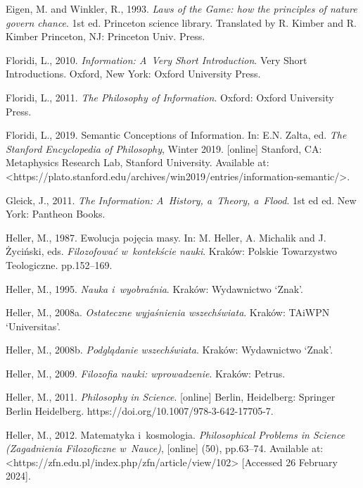 Eigen, M. and Winkler, R., 1993. \textit{Laws of the Game: how the principles of nature govern chance}. 1st ed. Princeton science library. Translated by R. Kimber and R. Kimber Princeton, NJ: Princeton Univ. Press.



Floridi, L., 2010. \textit{Information: A~Very Short Introduction}. Very Short Introductions. Oxford, New York: Oxford University Press.



Floridi, L., 2011. \textit{The Philosophy of Information}. Oxford: Oxford University Press.



Floridi, L., 2019. Semantic Conceptions of Information. In: E.N. Zalta, ed. \textit{The Stanford Encyclopedia of Philosophy}, Winter 2019. [online] Stanford, CA: Metaphysics Research Lab, Stanford University. Available at: {\textless}https://plato.stanford.edu/archives/win2019/entries/information-semantic/{\textgreater}.



Gleick, J., 2011. \textit{The Information: A~History, a~Theory, a~Flood}. 1st ed ed. New York: Pantheon Books.



Heller, M., 1987. Ewolucja pojęcia masy. In: M. Heller, A. Michalik and J. Życiński, eds. \textit{Filozofować w~kontekście nauki}. Kraków: Polskie Towarzystwo Teologiczne. pp.152–169.



Heller, M., 1995. \textit{Nauka i~wyobraźnia}. Kraków: Wydawnictwo ‘Znak'.



Heller, M., 2008a. \textit{Ostateczne wyjaśnienia wszechświata}. Kraków: TAiWPN ‘Universitas'.



Heller, M., 2008b. \textit{Podglądanie wszechświata}. Kraków: Wydawnictwo ‘Znak'.



Heller, M., 2009. \textit{Filozofia nauki: wprowadzenie}. Kraków: Petrus.



Heller, M., 2011. \textit{Philosophy in Science}. [online] Berlin, Heidelberg: Springer Berlin Heidelberg. https://doi.org/10.1007/978-3-642-17705-7.



Heller, M., 2012. Matematyka i~kosmologia. \textit{Philosophical Problems in Science (Zagadnienia Filozoficzne w~Nauce)}, [online] (50), pp.63–74. Available at: {\textless}https://zfn.edu.pl/index.php/zfn/article/view/102{\textgreater} [Accessed 26 February 2024].



